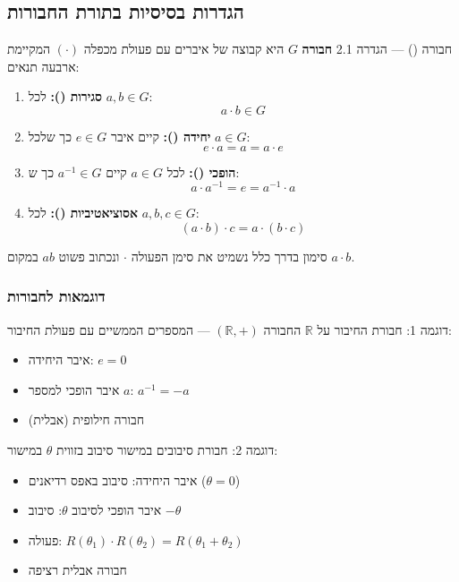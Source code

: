 \subsection{הגדרות בסיסיות בתורת החבורות}

\begin{definitionbox}{חבורה () — הגדרה 2.1}
\textbf{חבורה} $G$ היא קבוצה של איברים עם פעולת מכפלה $(\cdot)$ המקיימת ארבעה תנאים:

\begin{enumerate}
    \item \textbf{סגירות ():} לכל $a, b \in G$:
    \[
    a \cdot b \in G
    \]
    
    \item \textbf{יחידה ():} קיים איבר $e \in G$ כך שלכל $a \in G$:
    \[
    e \cdot a = a = a \cdot e
    \]
    
    \item \textbf{הופכי ():} לכל $a \in G$ קיים $a^{-1} \in G$ כך ש:
    \[
    a \cdot a^{-1} = e = a^{-1} \cdot a
    \]
    
    \item \textbf{אסוציאטיביות ():} לכל $a, b, c \in G$:
    \[
    (a \cdot b) \cdot c = a \cdot (b \cdot c)
    \]

\end{enumerate}
\end{definitionbox}

\begin{notebox}{סימון}
בדרך כלל נשמיט את סימן הפעולה $\cdot$ ונכתוב פשוט $ab$ במקום $a \cdot b$.
\end{notebox}

\subsubsection*{דוגמאות לחבורות}

\begin{examplebox}{דוגמה 1: חבורת החיבור על $\mathbb{R}$}
החבורה $(\mathbb{R}, +)$ — המספרים הממשיים עם פעולת החיבור:
\begin{itemize}
    \item איבר היחידה: $e = 0$
    \item איבר הופכי למספר $a$: $a^{-1} = -a$
    \item חבורה חילופית (אבלית)
\end{itemize}
\end{examplebox}

\begin{examplebox}{דוגמה 2: חבורת סיבובים במישור}
סיבוב בזווית $\theta$ במישור:
\begin{itemize}
    \item איבר היחידה: סיבוב באפס רדיאנים ($\theta = 0$)
    \item איבר הופכי לסיבוב $\theta$: סיבוב $-\theta$
    \item פעולה: $R(\theta_1) \cdot R(\theta_2) = R(\theta_1 + \theta_2)$
    \item חבורה אבלית רציפה
\end{itemize}
\end{examplebox}


